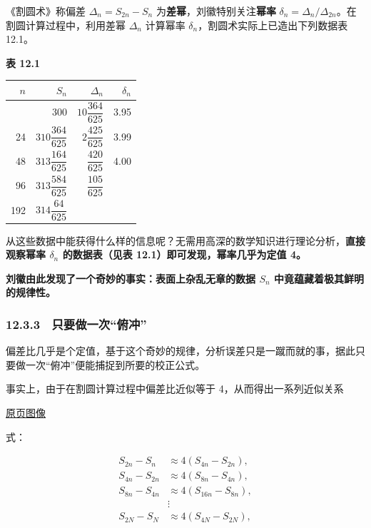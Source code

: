 \documentclass[
  10pt,
  fontset=fandol]{ctexart}
\newcounter{none} %
\begin{document}
《割圆术》称偏差 \(\Delta_n=S_{2n}-S_n\) 为\textbf{差幂}，刘徽特别关注\textbf{幂率} \(\delta_n=\Delta_n/\Delta_{2n}\)。在割圆计算过程中，利用差幂 \(\Delta_n\) 计算幂率 \(\delta_n\)，割圆术实际上已造出下列数据表 12.1。

\textbf{表 12.1}

\begingroup
\renewcommand{\arraystretch}{2.2}

{\def\LTcaptype{none} %
\begin{longtable}[]{@{}rrrr@{}}
\toprule\noalign{}
\(n\) & \(S_n\) & \(\Delta_n\) & \(\delta_n\) \\
\midrule\noalign{}
\endhead
\bottomrule\noalign{}
\endlastfoot
12 & 300 & \(10\dfrac{364}{625}\) & 3.95 \\
24 & \(310\dfrac{364}{625}\) & \(2\dfrac{425}{625}\) & 3.99 \\
48 & \(313\dfrac{164}{625}\) & \(\dfrac{420}{625}\) & 4.00 \\
96 & \(313\dfrac{584}{625}\) & \(\dfrac{105}{625}\) & \\
192 & \(314\dfrac{64}{625}\) & & \\
\end{longtable}
}

\endgroup

从这些数据中能获得什么样的信息呢？无需用高深的数学知识进行理论分析，\textbf{直接观察幂率 \(\delta_n\) 的数据表（见表 12.1）即可发现，幂率几乎为定值 4。}

\textbf{刘徽由此发现了一个奇妙的事实：表面上杂乱无章的数据 \(S_n\) 中竟蕴藏着极其鲜明的规律性。}

\subsubsection{12.3.3　只要做一次``俯冲''}\label{ux53eaux8981ux505aux4e00ux6b21ux4fefux51b2}

偏差比几乎是个定值，基于这个奇妙的规律，分析误差只是一蹴而就的事，据此只要做一次``俯冲''便能捕捉到所要的校正公式。

事实上，由于在割圆计算过程中偏差比近似等于 4，从而得出一系列近似关系

\href{../../source-images/pdf-300.jpeg}{原页图像}

式：

\[
\begin{aligned}
S_{2n}-S_n&\approx4(S_{4n}-S_{2n}),\\
S_{4n}-S_{2n}&\approx4(S_{8n}-S_{4n}),\\
S_{8n}-S_{4n}&\approx4(S_{16n}-S_{8n}),\\
&\vdots\\
S_{2N}-S_N&\approx4(S_{4N}-S_{2N}),
\end{aligned}
\]
\end{document}
